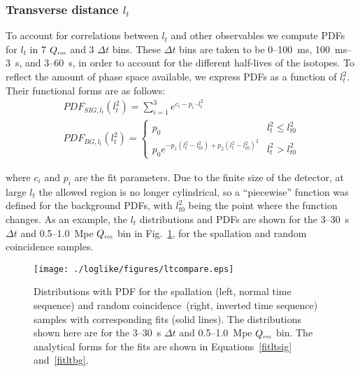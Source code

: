 \subsubsection{Transverse distance $l_t$}
To account for correlations between $l_t$ and other observables we compute PDFs for $l_t$ in 7 $Q_{\mbox{\tiny res}}$ and 3 $\Delta t$ bins. These $\Delta t$ bins are taken to be 0--100~ms, 100~ms--3~s, and 3--60~s, in order to account for the different half-lives of the isotopes. To reflect the amount of phase space available, we express PDFs as a function of $l_t^2$. Their functional forms are as follows:
\begin{gather}
\label{fitltsig}
    PDF_{SIG,l_t}(l_t^2) = \sum_{i=1}^3e^{c_i - p_i\cdot l_t^2}\\
    \label{fitltbg}
    PDF_{BG,l_t}(l_t^2) = 
    \begin{cases}
       p_0 & l_t^2 \leq l_{t0}^2 \\ 
       p_0e^{-p_1(l_t^2 - l_{t0}^2) + p_2(l_t^2-l_{t0}^2)^2}          & l_t^2 > l_{t0}^2 
    \end{cases}
\end{gather}

\noindent where $c_i$ and $p_i$ are the fit parameters. Due to the finite size of the detector, at large $l_t$ the allowed region is no longer cylindrical, so a ``piecewise'' function was defined for the background PDFs, with $l_{t0}^2$ being the point where the function changes. As an example, the $l_t$ distributions and PDFs are shown for the 3--30~s $\Delta t$ and 0.5--1.0~Mpe $Q_{\mbox{\tiny res}}$ bin in Fig.~\ref{fig:lt2both}, for the spallation and random coincidence samples.

\begin{figure*}
    \centering
    \texttt{[image: ./loglike/figures/ltcompare.eps]}
    \caption{Distributions with PDF for the spallation (left, normal time sequence) and random coincidence~(right, inverted time sequence) samples with corresponding fits (solid lines). The distributions shown here are for the 3--30~s $\Delta t$ and 0.5--1.0~Mpe $Q_{\mbox{\tiny res}}$ bin. The analytical forms for the fits are shown in Equations~\ref{fitltsig} and~\ref{fitltbg}.}
    \label{fig:lt2both}
\end{figure*}

